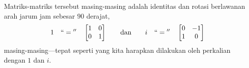 
Matriks-matriks tersebut masing-masing adalah identitas dan rotasi berlawanan
arah jarum jam sebesar $90$ derajat,
\begin{equation*}
1 \quad ``{}={}'' \quad
\begin{bmatrix}
1 & 0 \\
0 & 1
\end{bmatrix} \qquad \text{dan} \qquad
i \quad ``{}={}'' \quad
\begin{bmatrix}
0 & -1 \\
1 & 0
\end{bmatrix} 
\end{equation*}
masing-masing---tepat seperti yang kita harapkan dilakukan oleh perkalian
dengan $1$ dan $i$.
